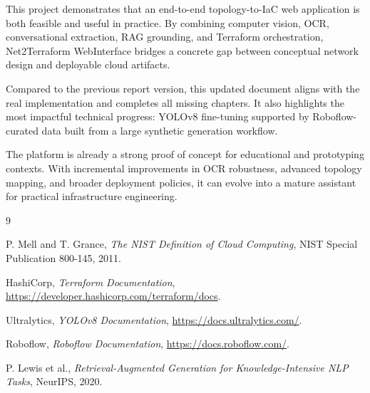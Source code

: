 \documentclass[12pt,a4paper,openany]{report}
\begin{document}
This project demonstrates that an end-to-end topology-to-IaC web application is both feasible and useful in practice. By combining computer vision, OCR, conversational extraction, RAG grounding, and Terraform orchestration, Net2Terraform WebInterface bridges a concrete gap between conceptual network design and deployable cloud artifacts.

Compared to the previous report version, this updated document aligns with the real implementation and completes all missing chapters. It also highlights the most impactful technical progress: YOLOv8 fine-tuning supported by Roboflow-curated data built from a large synthetic generation workflow.

The platform is already a strong proof of concept for educational and prototyping contexts. With incremental improvements in OCR robustness, advanced topology mapping, and broader deployment policies, it can evolve into a mature assistant for practical infrastructure engineering.

\begin{thebibliography}{9}

P. Mell and T. Grance,
\textit{The NIST Definition of Cloud Computing},
NIST Special Publication 800-145, 2011.

HashiCorp,
\textit{Terraform Documentation},
\url{https://developer.hashicorp.com/terraform/docs}.

Ultralytics,
\textit{YOLOv8 Documentation},
\url{https://docs.ultralytics.com/}.

Roboflow,
\textit{Roboflow Documentation},
\url{https://docs.roboflow.com/}.

P. Lewis et al.,
\textit{Retrieval-Augmented Generation for Knowledge-Intensive NLP Tasks},
NeurIPS, 2020.

\end{thebibliography}
\end{document}
